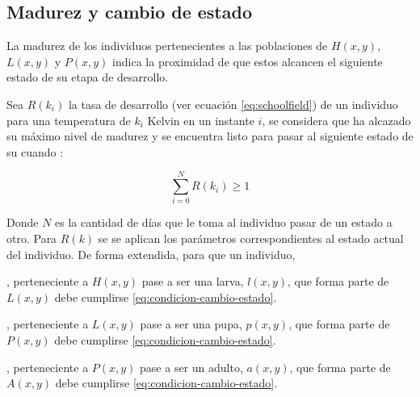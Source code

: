 \subsection{Madurez y cambio de estado}
La madurez de los individuos pertenecientes a las poblaciones de $H(x,y)$, $L(x,y)$ y $P(x,y)$
indica la proximidad de que estos alcancen el siguiente estado de su etapa de desarrollo.

Sea $R(k_{i})$ la tasa de desarrollo (ver ecuación \eqref{eq:schoolfield}) de un individuo para
una temperatura de $k_{i}$ Kelvin en un instante $i$, se considera que ha alcazado su máximo nivel
de madurez y se encuentra listo para pasar al siguiente estado de su cuando :

\begin{equation}
\label{eq:condicion-cambio-estado}
    \sum_{i=0}^{N} R(k_{i}) \geq 1
\end{equation}

Donde $N$ es la cantidad de días que le toma al individuo pasar de un estado a otro. Para $R(k)$ se
se aplican los parámetros correspondientes al estado actual del individuo. De forma extendida,
para que un individuo,

\begin{description}[style=multiline,leftmargin=1.5cm]
\item[$h(x,y)$], perteneciente a $H(x,y)$ pase a ser una larva, $l(x,y)$, que forma
parte de $L(x,y)$ debe cumplirse \eqref{eq:condicion-cambio-estado}.

\item[$l(x,y)$], perteneciente a $L(x,y)$ pase a ser una pupa, $p(x,y)$, que forma
parte de $P(x,y)$ debe cumplirse \eqref{eq:condicion-cambio-estado}.

\item[$p(x,y)$], perteneciente a $P(x,y)$ pase a ser un adulto, $a(x,y)$, que forma
parte de $A(x,y)$ debe cumplirse \eqref{eq:condicion-cambio-estado}.
\end{description}





